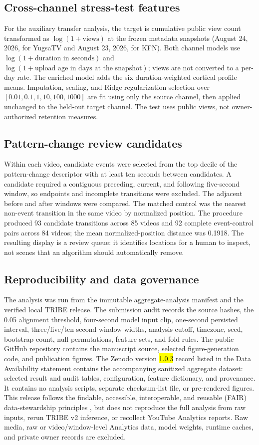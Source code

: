 \documentclass{ieeeaccess}
\newcommand{\rev}[1]{\hl{#1}}
\newcommand{\rev}[1]{#1}
\begin{document}
\subsection{Cross-channel stress-test features}
For the auxiliary transfer analysis, the target is cumulative public view count transformed as $\log(1+\text{views})$ at the frozen metadata snapshots (August 24, 2026, for YugsaTV and August 23, 2026, for KFN). Both channel models use $\log(1+\text{duration in seconds})$ and $\log(1+\text{upload age in days at the snapshot})$; views are not converted to a per-day rate. The enriched model adds the six duration-weighted cortical profile means. Imputation, scaling, and Ridge regularization selection over $[0.01,0.1,1,10,100,1000]$ are fit using only the source channel, then applied unchanged to the held-out target channel. The test uses public views, not owner-authorized retention measures.

\subsection{Pattern-change review candidates}
Within each video, candidate events were selected from the top decile of the pattern-change descriptor with at least ten seconds between candidates. A candidate required a contiguous preceding, current, and following five-second window, so endpoints and incomplete transitions were excluded. The adjacent before and after windows were compared. The matched control was the nearest non-event transition in the same video by normalized position. The procedure produced 93 candidate transitions across 85 videos and 92 complete event-control pairs across 84 videos; the mean normalized-position distance was 0.1918. The resulting display is a review queue: it identifies locations for a human to inspect, not scenes that an algorithm should automatically remove.

\subsection{Reproducibility and data governance}
The analysis was run from the immutable aggregate-analysis manifest and the verified local TRIBE release. The submission audit records the source hashes, the 0.05 alignment threshold, four-second model input clip, one-second persisted interval, three/five/ten-second window widths, analysis cutoff, timezone, seed, bootstrap count, null permutations, feature sets, and fold rules. The public GitHub repository contains the manuscript source, selected figure-generation code, and publication figures. The Zenodo version \rev{1.0.3} record listed in the Data Availability statement contains the accompanying sanitized aggregate dataset: selected result and audit tables, configuration, feature dictionary, and provenance. It contains no analysis scripts, separate checksum-list file, or pre-rendered figures. This release follows the findable, accessible, interoperable, and reusable (FAIR) data-stewardship principles \cite{wilkinson2016fair}, but does not reproduce the full analysis from raw inputs, rerun TRIBE v2 inference, or recollect YouTube Analytics reports. Raw media, raw or video/window-level Analytics data, model weights, runtime caches, and private owner records are excluded.
\end{document}
